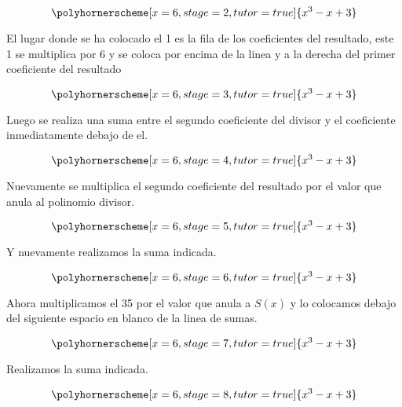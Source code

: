 \documentclass[11pt,letterpaper,oneside]{book}
\numberwithin{equation}{section}
\begin{document}
		\begin{equation*}
		\polyhornerscheme[x=6,stage=2,tutor=true]{x^3-x+3}
		\end{equation*}	

	\par El lugar donde se ha colocado el 1 es la fila de los coeficientes del resultado, este 1 se multiplica por 6 y se coloca por encima de la linea y a la derecha del primer coeficiente del resultado
	
		\begin{equation*}
		\polyhornerscheme[x=6,stage=3,tutor=true]{x^3-x+3}
		\end{equation*}
	
	\par Luego se realiza una suma entre el segundo coeficiente del divisor y el coeficiente inmediatamente debajo de el.
	
		\begin{equation*}
		\polyhornerscheme[x=6,stage=4,tutor=true]{x^3-x+3}
		\end{equation*}
	
	\par Nuevamente se multiplica el segundo coeficiente del resultado por el valor que anula al polinomio divisor.
	
		\begin{equation*}
		\polyhornerscheme[x=6,stage=5,tutor=true]{x^3-x+3}
		\end{equation*}

	\par Y nuevamente realizamos la suma indicada.
	
		\begin{equation*}
		\polyhornerscheme[x=6,stage=6,tutor=true]{x^3-x+3}
		\end{equation*}

	\par Ahora multiplicamos el 35 por el valor que anula a $S(x)$ y lo colocamos debajo del siguiente espacio en blanco de la linea de sumas.
	
		\begin{equation*}
		\polyhornerscheme[x=6,stage=7,tutor=true]{x^3-x+3}
		\end{equation*}

	\par Realizamos la suma indicada.
	
		\begin{equation*}
		\polyhornerscheme[x=6,stage=8,tutor=true]{x^3-x+3}
		\end{equation*}
	
\end{document}

